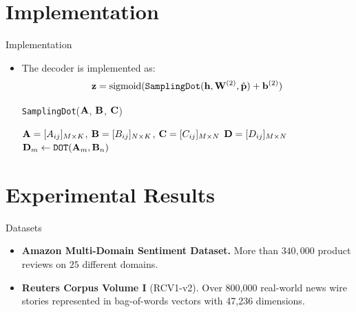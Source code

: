 \documentclass{beamer}
\begin{document}
\section{Implementation}
\begin{frame}{Implementation}
\begin{itemize}
\item The decoder is implemented as:
\[
{\bf z} = \mathrm{sigmoid}(\texttt{SamplingDot}({\bf h}, {\bf W}^{(2)}, \hat{\bf p}) + {\bf b}^{(2)})
\]
\vspace{-0.5cm}
\begin{center}
\begin{minipage}{0.9\textwidth}
    \begin{algorithm}[H]
    \caption{\texttt{SamplingDot}(${\bf A}$, ${\bf B}$, ${\bf C}$)}
    \begin{algorithmic}
    \INPUT ${\bf A} = [A_{ij}]_{M\times K}$, ${\bf B} = [B_{ij}]_{N\times K}$, ${\bf C} = [C_{ij}]_{M\times N}$
    \OUTPUT ${\bf D} = [D_{ij}]_{M\times N}$
    \STATE
                \STATE ${\bf D}_{m} \gets \texttt{DOT}({\bf A}_{m}, {\bf B}_{n})$
            \ENDIF
        \ENDFOR
    \ENDFOR
    \end{algorithmic}
    \end{algorithm}
\end{minipage}
\end{center}
\end{itemize}
\end{frame}

\section{Experimental Results}
\begin{frame}{Datasets}
\begin{itemize}
\item {\bf Amazon Multi-Domain Sentiment Dataset.} More than $340,000$ product reviews 
on $25$ different domains.
\item {\bf Reuters Corpus Volume I} (RCV1-v2). Over 800,000 real-world
news wire stories represented in bag-of-words vectors with 47,236 dimensions.
\end{itemize}
\end{frame}
\end{document}
